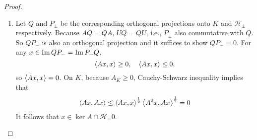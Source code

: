 \documentclass[a4paper,12pt]{article}
\begin{document}
\begin{proof}
\begin{enumerate}[label=(\arabic{*})]
        \item Let $Q$ and $P_\pm$ be the corresponding orthogonal projections onto $K$ and $\mathcal{H}_\pm$ respectively. Because $AQ = QA$, $UQ = QU$, i.e., $P_\pm$ also commutative with $Q$. So $QP_-$ is also an orthogonal projection and it suffices to show $QP_- = 0$. For any $x \in \operatorname{Im} QP_- = \operatorname{Im} P_-Q$, 
        \begin{equation*}
            \left\langle Ax,x \right\rangle \geq0,\quad \left\langle Ax,x \right\rangle \leq 0,
        \end{equation*} 
        so $\left\langle Ax,x \right\rangle = 0$. On $K$, because $A_K \geq 0$, Cauchy-Schwarz inequality implies that
        \begin{equation*}
            \left\langle Ax,Ax \right\rangle \leq \left\langle Ax,x \right\rangle^\frac{1}{2}\left\langle A^2x,Ax \right\rangle^\frac{1}{2} = 0
        \end{equation*}
        It follows that $x \in \ker A \cap \mathcal{H}_ = 0$. \qedhere
    \end{enumerate}
\end{proof}
\end{document}
